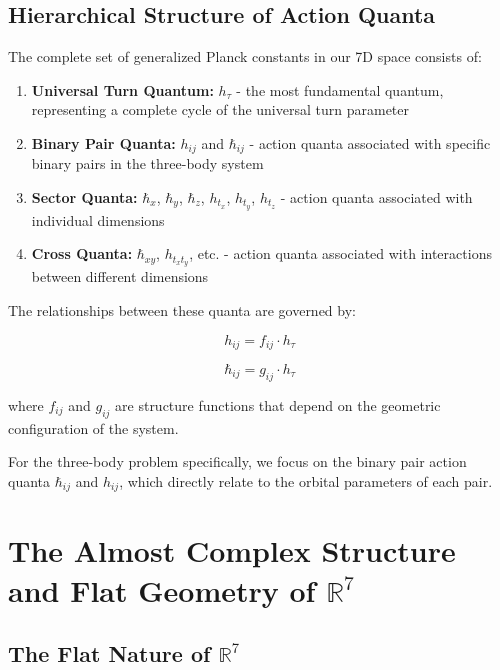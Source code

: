 \documentclass{article}
\begin{document}
\subsection{Hierarchical Structure of Action Quanta}

The complete set of generalized Planck constants in our 7D space consists of:

\begin{enumerate}
\item \textbf{Universal Turn Quantum:} $h_\tau$ - the most fundamental quantum, representing a complete cycle of the universal turn parameter
\item \textbf{Binary Pair Quanta:} $h_{ij}$ and $\hbar_{ij}$ - action quanta associated with specific binary pairs in the three-body system
\item \textbf{Sector Quanta:} $\hbar_x$, $\hbar_y$, $\hbar_z$, $h_{t_x}$, $h_{t_y}$, $h_{t_z}$ - action quanta associated with individual dimensions
\item \textbf{Cross Quanta:} $\hbar_{xy}$, $h_{t_x t_y}$, etc. - action quanta associated with interactions between different dimensions
\end{enumerate}

The relationships between these quanta are governed by:

\begin{equation}
h_{ij} = f_{ij} \cdot h_\tau
\end{equation}

\begin{equation}
\hbar_{ij} = g_{ij} \cdot h_\tau
\end{equation}

where $f_{ij}$ and $g_{ij}$ are structure functions that depend on the geometric configuration of the system.

For the three-body problem specifically, we focus on the binary pair action quanta $\hbar_{ij}$ and $h_{ij}$, which directly relate to the orbital parameters of each pair.

\section{The Almost Complex Structure and Flat Geometry of $\mathbb{R}^7$}

\subsection{The Flat Nature of $\mathbb{R}^7$}
\end{document}
